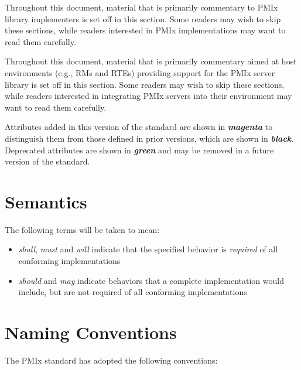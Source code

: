 \adviceimplstart
Throughout this document, material that is primarily commentary to \ac{PMIx} library implementers is set off in this section.
Some readers may wish to skip these sections, while readers interested in \ac{PMIx} implementations may want to read them carefully.
\adviceimplend

\advicermstart
Throughout this document, material that is primarily commentary aimed at host environments (e.g., \acp{RM} and \acp{RTE}) providing support for the \ac{PMIx} server library is set off in this section.
Some readers may wish to skip these sections, while readers interested in integrating \ac{PMIx} servers into their environment may want to read them carefully.
\advicermend

Attributes added in this version of the standard are shown in \textit{\textbf{\color{magenta}magenta}} to distinguish them from those defined in prior versions, which are shown in \textit{\textbf{black}}. Deprecated attributes are shown in \textit{\textbf{\color{green!80!black}green}} and may be removed in a future version of the standard.

\section{Semantics}

The following terms will be taken to mean:

\begin{itemize}
\item \emph{shall}, \emph{must} and \emph{will} indicate that the specified behavior is \emph{required} of all conforming implementations
\item \emph{should} and \emph{may} indicate behaviors that a complete implementation would include, but are not required of all conforming implementations
\end{itemize}

\section{Naming Conventions}

The \ac{PMIx} standard has adopted the following conventions:

